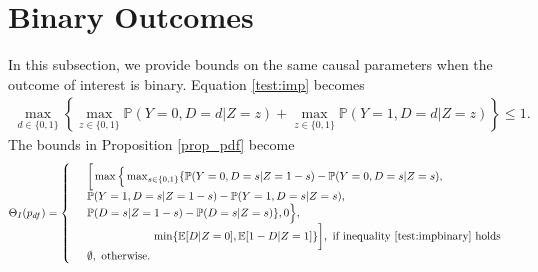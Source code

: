 \documentclass[12pt]{article}
\theoremstyle{plain}
\theoremstyle{definition}
\theoremstyle{remark}
\begin{document}
\section{Binary Outcomes}\label{binaryoutcome}
In this subsection, we provide bounds on the same causal parameters when the outcome of interest is binary. 
Equation \eqref{test:imp} becomes
\begin{eqnarray}\label{test:impbinary}
    \max_{d\in \{0,1\}}\left\{\max_{z\in\{0,1\}} \mathbb P(Y=0,D=d \vert Z=z) +\max_{z\in\{0,1\}} \mathbb P(Y=1,D=d \vert Z=z)\right\} \leq 1.
\end{eqnarray}
The bounds in Proposition \ref{prop_pdf} become
\small \begin{eqnarray}\label{prop21binary}
\Theta_{I}(p_{df}) = \left\{\begin{array}{lll}
& \bigg[\max \Big\{\max _{s \in\{0,1\}}\{\mathbb{P}(Y=0, D=s  \vert  Z=1-s)-\mathbb{P}(Y=0, D=s  \vert  Z=s),\\ &\mathbb{P}(Y=1, D=s  \vert  Z=1-s)-\mathbb{P}(Y=1, D=s  \vert  Z=s),\\ 
&\mathbb{P}(D=s  \vert  Z=1-s)-\mathbb{P}(D=s  \vert  Z=s)\}, 0 \Big\}, \\
& \qquad \qquad \qquad \min \{\mathbb{E}[D  \vert  Z=0], \mathbb{E}[1-D  \vert  Z=1]\}\bigg], \text{ if inequality } \eqref{test:impbinary} \text{ holds } \\
& \emptyset, \text{ otherwise}.
\end{array}\right.
\end{eqnarray}


\end{document}
